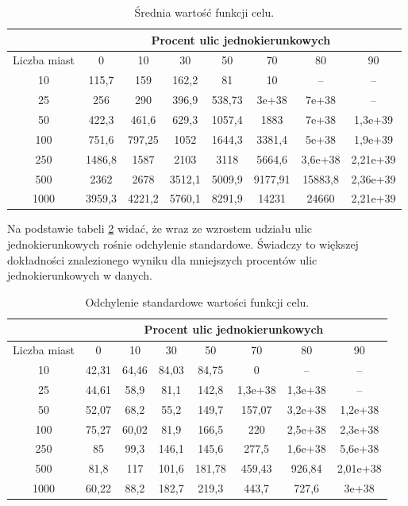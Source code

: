 \documentclass[11pt,a4paper,twoside]{article}
\begin{document}
\bgroup
\def\arraystretch{1.2}
\begin{table}[ht]
\centering
\begin{tabular}{|c|c|c|c|c|c|c|c|}
\hline
 & \multicolumn{7}{c|}{Procent ulic jednokierunkowych}\\\hline
Liczba miast & 0 & 10 & 30 & 50 & 70& 80& 90\\  \hline
10& 115,7& 159& 162,2& 81& 10& --& --\\ \hline
25& 256& 290& 396,9& 538,73& 3e+38& 7e+38& --\\ \hline
50& 422,3& 461,6& 629,3& 1057,4& 1883& 7e+38& 1,3e+39\\ \hline
100& 751,6& 797,25& 1052& 1644,3& 3381,4& 5e+38& 1,9e+39\\ \hline
250& 1486,8& 1587& 2103& 3118& 5664,6& 3,6e+38& 2,21e+39\\ \hline
500& 2362& 2678& 3512,1& 5009,9& 9177,91& 15883,8& 2,36e+39\\ \hline
1000& 3959,3& 4221,2& 5760,1& 8291,9& 14231& 24660& 2,21e+39\\ \hline
\end{tabular}
\caption{Średnia wartość funkcji celu.}
\label{sredniafCelu}
\end{table}
\egroup

Na podstawie tabeli \ref{odchylenieSredniafCelu} widać, że wraz ze wzrostem udziału ulic jednokierunkowych rośnie odchylenie standardowe. Świadczy to większej dokładności znalezionego wyniku dla mniejszych procentów ulic jednokierunkowych w danych.

\bgroup
\def\arraystretch{1.2}
\begin{table}[ht]
\centering
\begin{tabular}{|c|c|c|c|c|c|c|c|}
\hline
 & \multicolumn{7}{c|}{Procent ulic jednokierunkowych}\\\hline
Liczba miast & 0 & 10 & 30 & 50 & 70& 80& 90\\  \hline
10& 42,31& 64,46& 84,03& 84,75& 0& --& --\\ \hline
25& 44,61& 58,9& 81,1& 142,8& 1,3e+38& 1,3e+38& --\\ \hline
50& 52,07& 68,2& 55,2& 149,7& 157,07& 3,2e+38& 1,2e+38\\ \hline
100& 75,27& 60,02& 81,9& 166,5& 220& 2,5e+38& 2,3e+38\\ \hline
250& 85& 99,3& 146,1& 145,6& 277,5& 1,6e+38& 5,6e+38\\ \hline
500& 81,8& 117& 101,6& 181,78& 459,43& 926,84& 2,01e+38\\ \hline
1000& 60,22& 88,2& 182,7& 219,3& 443,7& 727,6& 3e+38\\ \hline
\end{tabular}
\caption{Odchylenie standardowe wartości funkcji celu.}
\label{odchylenieSredniafCelu}
\end{table}
\egroup
\end{document}
